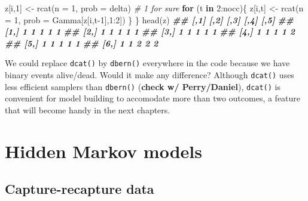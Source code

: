 \documentclass[
  12pt,
]{krantz}
\newenvironment{Shaded}{\begin{snugshade}}{\end{snugshade}}
\newcommand{\AttributeTok}[1]{\textcolor[rgb]{0.77,0.63,0.00}{#1}}
\newcommand{\CommentTok}[1]{\textcolor[rgb]{0.56,0.35,0.01}{\textit{#1}}}
\newcommand{\ControlFlowTok}[1]{\textcolor[rgb]{0.13,0.29,0.53}{\textbf{#1}}}
\newcommand{\DecValTok}[1]{\textcolor[rgb]{0.00,0.00,0.81}{#1}}
\newcommand{\DocumentationTok}[1]{\textcolor[rgb]{0.56,0.35,0.01}{\textbf{\textit{#1}}}}
\newcommand{\FunctionTok}[1]{\textcolor[rgb]{0.00,0.00,0.00}{#1}}
\newcommand{\NormalTok}[1]{#1}
\newcommand{\OtherTok}[1]{\textcolor[rgb]{0.56,0.35,0.01}{#1}}
\newcommand{\SpecialCharTok}[1]{\textcolor[rgb]{0.00,0.00,0.00}{#1}}
\begin{document}
\begin{Shaded}
\begin{Highlighting}[]
\NormalTok{  z[i,}\DecValTok{1}\NormalTok{] }\OtherTok{\textless{}{-}} \FunctionTok{rcat}\NormalTok{(}\AttributeTok{n =} \DecValTok{1}\NormalTok{, }\AttributeTok{prob =}\NormalTok{ delta) }\CommentTok{\# 1 for sure}
  \ControlFlowTok{for}\NormalTok{ (t }\ControlFlowTok{in} \DecValTok{2}\SpecialCharTok{:}\NormalTok{nocc)\{}
\NormalTok{    z[i,t] }\OtherTok{\textless{}{-}} \FunctionTok{rcat}\NormalTok{(}\AttributeTok{n =} \DecValTok{1}\NormalTok{, }\AttributeTok{prob =}\NormalTok{ Gamma[z[i,t}\DecValTok{{-}1}\NormalTok{],}\DecValTok{1}\SpecialCharTok{:}\DecValTok{2}\NormalTok{]) }
\NormalTok{  \}}
\NormalTok{\}}
\FunctionTok{head}\NormalTok{(z) }
\DocumentationTok{\#\#      [,1] [,2] [,3] [,4] [,5]}
\DocumentationTok{\#\# [1,]    1    1    1    1    1}
\DocumentationTok{\#\# [2,]    1    1    1    1    1}
\DocumentationTok{\#\# [3,]    1    1    1    1    1}
\DocumentationTok{\#\# [4,]    1    1    1    1    2}
\DocumentationTok{\#\# [5,]    1    1    1    1    1}
\DocumentationTok{\#\# [6,]    1    1    2    2    2}
\end{Highlighting}
\end{Shaded}

We could replace \texttt{dcat()} by \texttt{dbern()} everywhere in the code because we have binary events alive/dead. Would it make any difference? Although \texttt{dcat()} uses less efficient samplers than \texttt{dbern()} (\textbf{check w/ Perry/Daniel}), \texttt{dcat()} is convenient for model building to accomodate more than two outcomes, a feature that will become handy in the next chapters.

\hypertarget{hidden-markov-models}{%
\section{Hidden Markov models}\label{hidden-markov-models}}

\hypertarget{capture-recapture-data}{%
\subsection{Capture-recapture data}\label{capture-recapture-data}}
\end{document}
